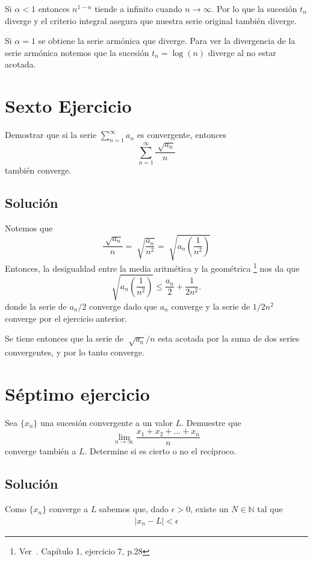 \documentclass[fleqn,leqno,11pt,letterpaper,final]{article}
\begin{document}
Si $\alpha<1$ entonces $n^{1-\alpha}$ tiende a infinito cuando $n\to\infty$.
Por lo que la sucesión $t_n$ diverge y el criterio integral
asegura que nuestra serie original también diverge.

Si $\alpha=1$ se obtiene la serie armónica que diverge.
Para ver la divergencia de la serie armónica notemos que
la sucesión $t_n=\log(n)$ diverge al no estar acotada.

\section{Sexto Ejercicio}%
Demostrar que si la serie $ \sum_{n=1}^{\infty} a_n$ es convergente, entonces
\[
	\sum_{n=1}^{\infty} \frac{\sqrt[]{a_n}}{n}  
\]
también converge.

\subsection{Solución}
Notemos que 
\[
	\frac{\sqrt[]{a_n}}{n} = \sqrt[]{ \frac{a_n}{n^2} }= \sqrt[]{a_n\left( \frac{1}{n^2}  \right)}
\]
Entonces, la desigualdad entre la media aritmética y la geométrica%
\footnote{Ver~\cite{spivak_calculus_2008}. Capítulo 1, ejercicio 7, p.28}
nos da que
\[
	\sqrt{a_n\left( \frac{1}{n^2}  \right)} \leq \frac{a_n}{2}+ \frac{1}{2n^2}.
\]
donde la serie de $a_n/2$ converge dado que $a_n$ converge y la serie de $1/2n^2$ converge por el ejercicio anterior.

Se tiene entonces que la serie de $\sqrt[]{a_n}/n$ esta acotada por la suma de dos series convergentes, y por lo tanto converge.

\section{Séptimo ejercicio}%
\label{sec:Séptimo ejercicio}
Sea $\{ x_n \}$ una sucesión convergente a un valor $L$. Demuestre que
\[
	\lim_{n \to \infty} \frac{x_1+x_2+\dots+x_n}{n} 
\]
converge también a $L$. Determine si es cierto o no el recíproco.

\subsection{Solución}
Como $\{ x_n \}$ converge  a $L$ sabemos que, dado $\epsilon>0$, existe un $N\in\mathbb{N}$
tal que
\begin{align}\label{eq2}
	\left\lvert x_n-L \right\rvert<\epsilon
\end{align}
\end{document}
